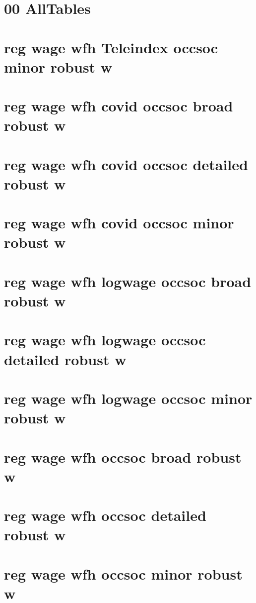 \documentclass{article}
\begin{document}
\tableofcontents
\newpage
\section{00 AllTables}

\newpage
\section{reg wage wfh Teleindex occsoc minor robust w}

\newpage
\section{reg wage wfh  covid occsoc broad robust w}

\newpage
\section{reg wage wfh  covid occsoc detailed robust w}

\newpage
\section{reg wage wfh  covid occsoc minor robust w}

\newpage
\section{reg wage wfh  logwage occsoc broad robust w}

\newpage
\section{reg wage wfh  logwage occsoc detailed robust w}

\newpage
\section{reg wage wfh  logwage occsoc minor robust w}

\newpage
\section{reg wage wfh  occsoc broad robust w}

\newpage
\section{reg wage wfh  occsoc detailed robust w}

\newpage
\section{reg wage wfh  occsoc minor robust w}

\newpage
\end{document}
